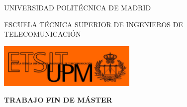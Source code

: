 \pagecolor{etsitorange}
\begin{titlepage}
	\centering
	{\scshape\LARGE UNIVERSIDAD POLITÉCNICA DE MADRID \par}
	\vspace{0.5cm}
	{\scshape\Large ESCUELA TÉCNICA SUPERIOR DE INGENIEROS DE TELECOMUNICACIÓN \par}
	\vspace{0.5cm}	
	\includegraphics[width=0.5\textwidth]{./img/01_front/logoescuela_naranja.jpg}\par\vspace{1cm} %
	{\huge\bfseries TRABAJO FIN DE MÁSTER\par}
	\vspace{0.5cm}
	{\scshape\Large \MakeUppercase{\myMaster} \par}
	\vspace{1cm}
	{\huge\bfseries \MakeUppercase{\myTitleEN} \par}
	\vspace{1cm}
	{\Large \MakeUppercase{\myFullname} \par}
	\vfill
	{\large \currentYear \par}
\end{titlepage}
\pagecolor{white}

\afterpage{\blankpage}
\cleardoublepage
